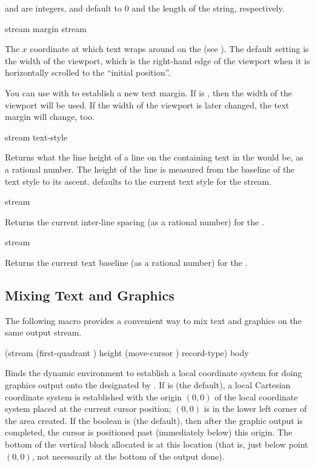  and  are integers, and default to 0 and the length of the
string, respectively.


 {stream}
 {margin stream}

The $x$ coordinate at which text wraps around on the   (see ).  The default setting
is the width of the viewport, which is the right-hand edge of the viewport when
it is horizontally scrolled to the ``initial position''.

You can use  with  to establish a new text
margin.  If  is , then the width of the viewport will be
used.  If the width of the viewport is later changed, the text margin will
change, too.


 {stream \key text-style}

Returns what the line height of a line on the 
 containing text in the   would be,
as a rational number.  The height of the line is measured from the baseline of
the text style to its ascent.   defaults to the current text
style for the stream.


 {stream}

Returns the current inter-line spacing (as a rational number) for the
 .

 {stream}

Returns the current text baseline (as a rational number) for the  .


\subsection {Mixing Text and Graphics}

The following macro provides a convenient way to mix text and graphics on the
same output stream.

 {(\optional stream
                                     \key (first-quadrant ) height (move-cursor )
                                          record-type)
                                    \body body}

Binds the dynamic environment to establish a local coordinate system for doing
graphics output onto the  designated by
.  If  is  (the default), a local
Cartesian coordinate system is established with the origin $(0,0)$ of the local
coordinate system placed at the current cursor position; $(0,0)$ is in the lower
left corner of the area created.  If the boolean  is
 (the default), then after the graphic output is completed, the
cursor is positioned past (immediately below) this origin.  The bottom of the
vertical block allocated is at this location (that is, just below point $(0,0)$,
not necessarily at the bottom of the output done).

